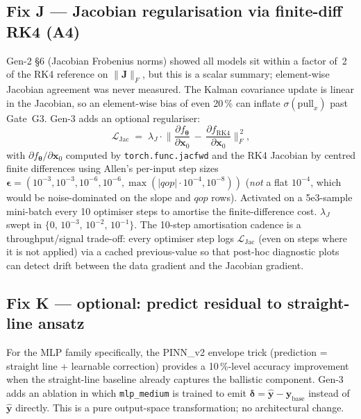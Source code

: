 \documentclass[a4paper,11pt]{article}
\newcommand{\num}[1]{#1}
\newcommand{\state}{\mathbf{y}}
\newcommand{\Jac}{\mathbf{J}}
\newcommand{\loss}{\mathcal{L}}
\newcommand{\btheta}{\bm{\theta}}
\begin{document}
\subsection{Fix J --- Jacobian regularisation via finite-diff RK4
(A4)}

Gen-2 §6 (Jacobian Frobenius norms) showed all models sit within a
factor of~2 of the RK4 reference on $\|\Jac\|_F$, but this is a
scalar summary; element-wise Jacobian agreement was never measured.
The Kalman covariance update is linear in the Jacobian, so an
element-wise bias of even \num{20}\,\% can inflate $\sigma(\mathrm{pull}_x)$
past Gate~G3.  Gen-3 adds an optional regulariser:
\begin{equation}
  \loss_\mathrm{Jac}
  \;=\;
  \lambda_J \cdot
  \bigg\|
     \frac{\partial f_{\btheta}}{\partial \mathbf{x}_0}
     \,-\,
     \frac{\partial f_\mathrm{RK4}}{\partial \mathbf{x}_0}
  \bigg\|_F^{\,2},
  \label{eq:jac_loss}
\end{equation}
with $\partial f_{\btheta}/\partial\mathbf{x}_0$ computed by
\texttt{torch.func.jacfwd} and the RK4 Jacobian by centred finite
differences using Allen's per-input step sizes
$\bm{\epsilon}=(10^{-3},10^{-3},10^{-6},10^{-6},\max(|qop|\cdot 10^{-4},10^{-8}))$
(\emph{not} a flat $10^{-4}$, which would be noise-dominated on the
slope and $qop$ rows).  Activated on a \num{5e3}-sample mini-batch every
\num{10} optimiser steps to amortise the finite-difference cost.
$\lambda_J$ swept in $\{0,\,10^{-3},\,10^{-2},\,10^{-1}\}$.
The 10-step amortisation cadence is a throughput/signal trade-off:
every optimiser step logs $\loss_\mathrm{Jac}$ (even on steps where
it is not applied) via a cached previous-value so that post-hoc
diagnostic plots can detect drift between the data gradient and the
Jacobian gradient.

\subsection{Fix K --- optional: predict residual to straight-line
ansatz}

For the MLP family specifically, the PINN\_v2 envelope trick
(prediction = straight line + learnable correction) provides a
\num{10}\,\%-level accuracy improvement when the straight-line
baseline already captures the ballistic component.  Gen-3 adds an
ablation in which \texttt{mlp\_medium} is trained to emit
$\bm{\delta}=\hat{\state}-\state_\text{base}$ instead of
$\hat{\state}$ directly.  This is a pure output-space transformation;
no architectural change.
\end{document}
